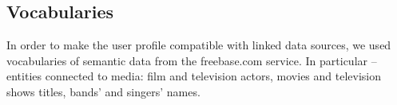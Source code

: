 \subsection{Vocabularies}
In order to make the user profile compatible with linked data sources, we used
vocabularies of semantic data from the freebase.com service. In particular --
entities connected to media: film and television actors, movies and television
shows titles, bands' and singers' names.
